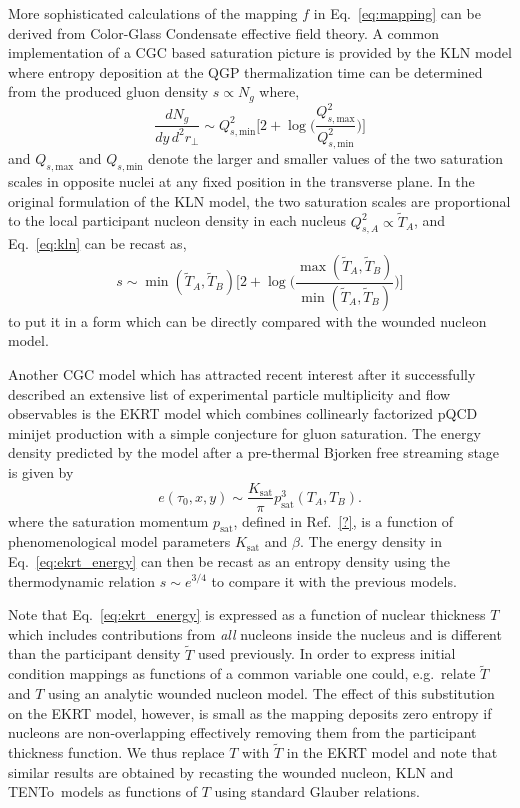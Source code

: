 \documentclass[aps,prc,reprint,amsmath,nofootinbib,superscriptaddress]{revtex4-1}
\newcommand{\trento}{T\raisebox{-0.5ex}{R}ENTo}
\newcommand{\T}{\tilde{T}}
\newcommand{\Qs}[1]{Q_{s,\text{#1}}}
\begin{document}
More sophisticated calculations of the mapping $f$ in Eq.~\eqref{eq:mapping} can be derived from Color-Glass Condensate effective field theory. A common implementation of a CGC based saturation picture is provided by the KLN model where entropy deposition at the QGP thermalization time can be determined from the produced gluon density $s \propto N_g$ where,
\begin{equation}
  \frac{dN_g}{dy\,d^2r_\perp} \sim \Qs{min}^2 \biggl[
    2 + \log \biggl(\frac{\Qs{max}^2}{\Qs{min}^2} \biggr)
  \biggr]
  \label{eq:kln}
\end{equation}
and $\Qs{max}$ and $\Qs{min}$ denote the larger and smaller values of the two saturation scales in opposite nuclei at any fixed position in the transverse plane.
In the original formulation of the KLN model, the two saturation scales are proportional to the local participant nucleon density in each nucleus $Q^2_{s,A} \propto \T_A$, and Eq.~\eqref{eq:kln} can be recast as,
\begin{equation}
  s \sim \min(\T_A, \T_B) \biggl[
    2 + \log \biggl(\frac{\max(\T_A,\T_B)}{\min(\T_A,\T_B)}\biggr)
  \biggr]
\end{equation}
to put it in a form which can be directly compared with the wounded nucleon model.

Another CGC model which has attracted recent interest after it successfully described an extensive list of experimental particle multiplicity and flow observables is the EKRT model which combines collinearly factorized pQCD minijet production with a simple conjecture for gluon saturation. The energy density predicted by the model after a pre-thermal Bjorken free streaming stage is given by
\begin{equation}
  e(\tau_0, x, y) \sim \frac{K_\text{sat}}{\pi} p_\text{sat}^3(T_A, T_B).
  \label{eq:ekrt_energy}
\end{equation}
where the saturation momentum $p_\text{sat}$, defined in Ref.~\ref{?}, is a function of phenomenological model parameters $K_\text{sat}$ and $\beta$. The energy density in Eq.~\eqref{eq:ekrt_energy} can then be recast as an entropy density using the thermodynamic relation ${s \sim e^{3/4}}$ to compare it with the previous models.

Note that Eq.~\eqref{eq:ekrt_energy} is expressed as a function of nuclear thickness $T$ which includes contributions from \emph{all} nucleons inside the nucleus and is different than the participant density $\T$ used previously. In order to express initial condition mappings as functions of a common variable one could, e.g.\ relate $\T$ and $T$ using an analytic wounded nucleon model. The effect of this substitution on the EKRT model, however, is small as the mapping deposits zero entropy if nucleons are non-overlapping effectively removing them from the participant thickness function. We thus replace $T$ with $\T$ in the EKRT model and note that similar results are obtained by recasting the wounded nucleon, KLN and \trento\ models as functions of $T$ using standard Glauber relations.
\end{document}
